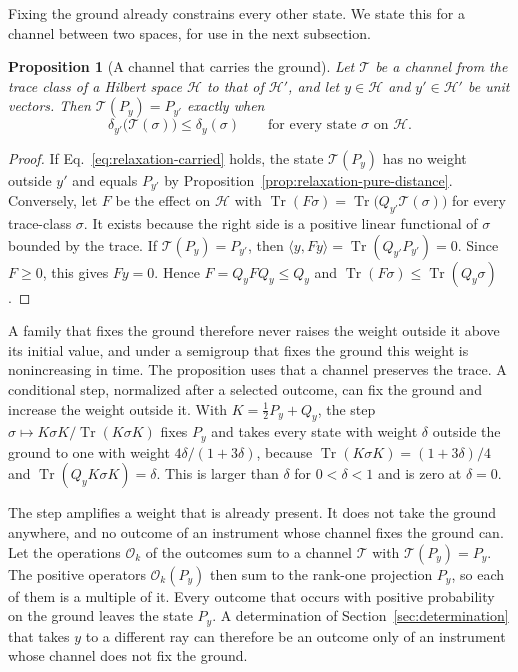 \documentclass[11pt]{article}
\newtheorem{proposition}{Proposition}[section]
\theoremstyle{definition}
\DeclareMathOperator{\Tr}{Tr}
\begin{document}
Fixing the ground already constrains every other state. We state this for a channel between two spaces, for use in the next subsection.

\begin{proposition}[A channel that carries the ground]
\label{prop:relaxation-carried}
Let $\mathcal T$ be a channel from the trace class of a Hilbert space $\mathcal H$ to that of $\mathcal H'$, and let $y\in\mathcal H$ and $y'\in\mathcal H'$ be unit vectors. Then $\mathcal T(P_y)=P_{y'}$ exactly when
\begin{equation}
 \delta_{y'}\bigl(\mathcal T(\sigma)\bigr)\le\delta_y(\sigma)\qquad\text{for every state $\sigma$ on $\mathcal H$.}
 \label{eq:relaxation-carried}
\end{equation}
\end{proposition}
\begin{proof}
If Eq.~\eqref{eq:relaxation-carried} holds, the state $\mathcal T(P_y)$ has no weight outside $y'$ and equals $P_{y'}$ by Proposition~\ref{prop:relaxation-pure-distance}. Conversely, let $F$ be the effect on $\mathcal H$ with $\Tr(F\sigma)=\Tr\bigl(Q_{y'}\mathcal T(\sigma)\bigr)$ for every trace-class $\sigma$. It exists because the right side is a positive linear functional of $\sigma$ bounded by the trace. If $\mathcal T(P_y)=P_{y'}$, then $\langle y,Fy\rangle=\Tr(Q_{y'}P_{y'})=0$. Since $F\ge0$, this gives $Fy=0$. Hence $F=Q_yFQ_y\le Q_y$ and $\Tr(F\sigma)\le\Tr(Q_y\sigma)$.
\end{proof}

A family that fixes the ground therefore never raises the weight outside it above its initial value, and under a semigroup that fixes the ground this weight is nonincreasing in time. The proposition uses that a channel preserves the trace. A conditional step, normalized after a selected outcome, can fix the ground and increase the weight outside it. With $K=\tfrac12P_y+Q_y$, the step $\sigma\mapsto K\sigma K/\Tr(K\sigma K)$ fixes $P_y$ and takes every state with weight $\delta$ outside the ground to one with weight $4\delta/(1+3\delta)$, because $\Tr(K\sigma K)=(1+3\delta)/4$ and $\Tr(Q_yK\sigma K)=\delta$. This is larger than $\delta$ for $0<\delta<1$ and is zero at $\delta=0$.

The step amplifies a weight that is already present. It does not take the ground anywhere, and no outcome of an instrument whose channel fixes the ground can. Let the operations $\mathcal O_k$ of the outcomes sum to a channel $\mathcal T$ with $\mathcal T(P_y)=P_y$. The positive operators $\mathcal O_k(P_y)$ then sum to the rank-one projection $P_y$, so each of them is a multiple of it. Every outcome that occurs with positive probability on the ground leaves the state $P_y$. A determination of Section~\ref{sec:determination} that takes $y$ to a different ray can therefore be an outcome only of an instrument whose channel does not fix the ground.
\end{document}
